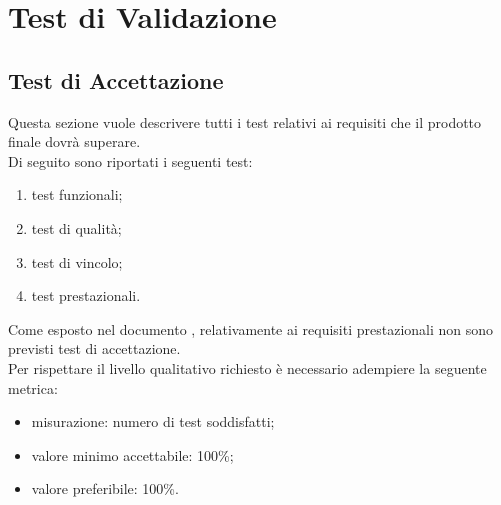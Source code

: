 \section{Test di Validazione}

\subsection{Test di Accettazione}
	Questa sezione vuole descrivere tutti i test relativi ai requisiti che il prodotto finale dovrà superare.\\
	Di seguito sono riportati i seguenti test:
	\begin{enumerate}
		\item test funzionali;
		\item test di qualità;
		\item test di vincolo;
		\item test prestazionali.
	\end{enumerate}
	Come esposto nel documento \AdR{}, relativamente ai requisiti prestazionali non sono previsti test di accettazione. \\
	Per rispettare il livello qualitativo richiesto è necessario adempiere la seguente metrica:
	\begin{itemize}
		\item{misurazione: numero di test soddisfatti;}
		\item{valore minimo accettabile: 100\%;}
		\item{valore preferibile: 100\%.}
	\end{itemize}